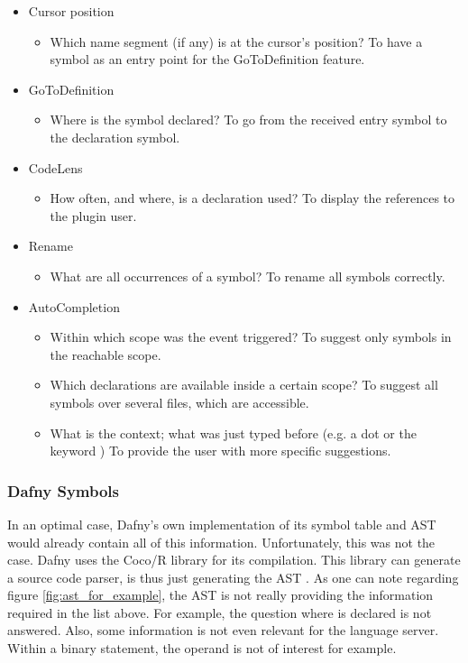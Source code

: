 \begin{itemize}
    \item Cursor position
    \begin{itemize}
        \item Which name segment (if any) is at the cursor's position?
        To have a symbol as an entry point for the GoToDefinition feature.
    \end{itemize}

    \item GoToDefinition
        \begin{itemize}
            \item Where is the symbol declared?
            To go from the received entry symbol to the declaration symbol.
        \end{itemize}

    \item CodeLens
        \begin{itemize}
            \item How often, and where, is a declaration used?
            To display the references to the plugin user.
        \end{itemize}

    \item Rename
        \begin{itemize}
            \item What are all occurrences of a symbol?
            To rename all symbols correctly.
        \end{itemize}

    \item AutoCompletion
        \begin{itemize}
            \item Within which scope was the event triggered?
            To suggest only symbols in the reachable scope.
            \item Which declarations are available inside a certain scope?
            To suggest all symbols over several files, which are accessible.
            \item What is the context; what was just typed before (e.g. a dot or the keyword )
            To provide the user with more specific suggestions.
        \end{itemize}
\end{itemize}

\subsubsection{Dafny Symbols}
In an optimal case, Dafny's own implementation of its symbol table and AST would already contain all of this information.
Unfortunately, this was not the case.
Dafny uses the Coco/R library for its compilation.
This library can generate a source code parser, is thus just generating the AST \cite{coco}.
As one can note regarding figure \ref{fig:ast_for_example}, the AST is not really providing the information required in the list above.
For example, the question where  is declared is not answered.
Also, some information is not even relevant for the language server.
Within a binary statement, the operand is not of interest for example.\\

